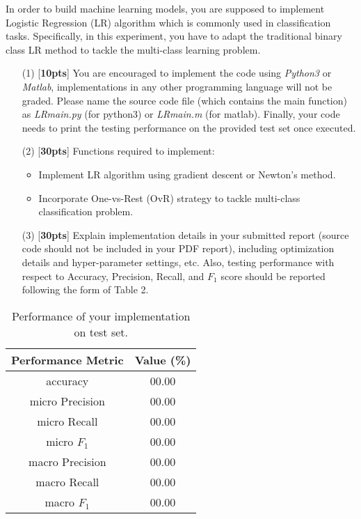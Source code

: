 \documentclass{article}
\begin{document}
In order to build machine learning models, you are supposed to implement Logistic Regression (LR) algorithm which is commonly used in classification tasks. Specifically, in this experiment, you have to adapt the traditional binary class LR method to tackle the multi-class learning problem. 

\begin{enumerate}
    \item[(1)] [\textbf{10pts}] You are encouraged to implement the code using \emph{Python3} or \emph{Matlab}, implementations in any other programming language will not be graded. Please name the source code file (which contains the main function) as \emph{LR\underline{\hspace{0.5em}}main.py} (for python3) or \emph{LR\underline{\hspace{0.5em}}main.m} (for matlab). Finally, your code needs to print the testing performance on the provided test set once executed.

    \item[(2)] [\textbf{30pts}] Functions required to implement:
    \begin{itemize}
        \item Implement LR algorithm using gradient descent or Newton's method.
        \item Incorporate One-vs-Rest (OvR) strategy to tackle multi-class classification problem.
    \end{itemize}
    \item[(3)] [\textbf{30pts}] Explain implementation details in your submitted report (source code should not be included in your PDF report), including optimization details and hyper-parameter settings, etc. Also, testing performance with respect to Accuracy, Precision, Recall, and $F_1$ score should be reported following the form of Table 2.
\end{enumerate}

\begin{table}[h]
    \centering
     \caption{Performance of your implementation on test set.}
     \vspace{2mm}
    \label{tab:my_label}
    \begin{tabular}{|c|c|}
       \hline
       Performance Metric & Value (\%) \\
       \hline
       accuracy & 00.00 \\
       \hline
       micro Precision  & 00.00\\
       \hline
       micro Recall & 00.00\\
       \hline
       micro $F_1$ & 00.00\\
       \hline
       macro Precision  & 00.00\\
       \hline
       macro Recall & 00.00\\
       \hline
       macro $F_1$ & 00.00\\
       \hline
    \end{tabular}

\end{table}
\end{document}
